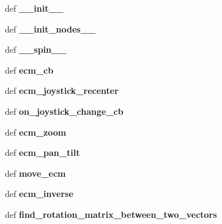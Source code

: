 \begin{DoxyCompactItemize}
\item 
\hypertarget{classjoystick_1_1Joystick_afef248a64bb142746b07f4f3af62388d}{def {\bfseries \-\_\-\-\_\-init\-\_\-\-\_\-}}\label{classjoystick_1_1Joystick_afef248a64bb142746b07f4f3af62388d}

\item 
\hypertarget{classjoystick_1_1Joystick_a873b6b966873adb22d8f807fcb5059f3}{def {\bfseries \-\_\-\-\_\-init\-\_\-nodes\-\_\-\-\_\-}}\label{classjoystick_1_1Joystick_a873b6b966873adb22d8f807fcb5059f3}

\item 
\hypertarget{classjoystick_1_1Joystick_a5fc42dd4d953577f4d3033cbe1c4754b}{def {\bfseries \-\_\-\-\_\-spin\-\_\-\-\_\-}}\label{classjoystick_1_1Joystick_a5fc42dd4d953577f4d3033cbe1c4754b}

\item 
\hypertarget{classjoystick_1_1Joystick_a04a9a65f1b7beb59b2d4935dc83dbd63}{def {\bfseries ecm\-\_\-cb}}\label{classjoystick_1_1Joystick_a04a9a65f1b7beb59b2d4935dc83dbd63}

\item 
\hypertarget{classjoystick_1_1Joystick_a644ff07de55168ab4d3fa98b7724b76b}{def {\bfseries ecm\-\_\-joystick\-\_\-recenter}}\label{classjoystick_1_1Joystick_a644ff07de55168ab4d3fa98b7724b76b}

\item 
\hypertarget{classjoystick_1_1Joystick_ad708a220d4c2019749d60a5b34bc904e}{def {\bfseries on\-\_\-joystick\-\_\-change\-\_\-cb}}\label{classjoystick_1_1Joystick_ad708a220d4c2019749d60a5b34bc904e}

\item 
\hypertarget{classjoystick_1_1Joystick_a9a784dbb2800a878a25f87708fae9e07}{def {\bfseries ecm\-\_\-zoom}}\label{classjoystick_1_1Joystick_a9a784dbb2800a878a25f87708fae9e07}

\item 
\hypertarget{classjoystick_1_1Joystick_ab8dddbccfcd5fc508d9607de1b6c6abe}{def {\bfseries ecm\-\_\-pan\-\_\-tilt}}\label{classjoystick_1_1Joystick_ab8dddbccfcd5fc508d9607de1b6c6abe}

\item 
\hypertarget{classjoystick_1_1Joystick_ab6b036728117f78839c836e3b3595b1a}{def {\bfseries move\-\_\-ecm}}\label{classjoystick_1_1Joystick_ab6b036728117f78839c836e3b3595b1a}

\item 
\hypertarget{classjoystick_1_1Joystick_a764b643d59fa789b8dd339c7684facad}{def {\bfseries ecm\-\_\-inverse}}\label{classjoystick_1_1Joystick_a764b643d59fa789b8dd339c7684facad}

\item 
\hypertarget{classjoystick_1_1Joystick_ad8222325ba8fd2900ab5734b8f2c2286}{def {\bfseries find\-\_\-rotation\-\_\-matrix\-\_\-between\-\_\-two\-\_\-vectors}}\label{classjoystick_1_1Joystick_ad8222325ba8fd2900ab5734b8f2c2286}

\end{DoxyCompactItemize}
